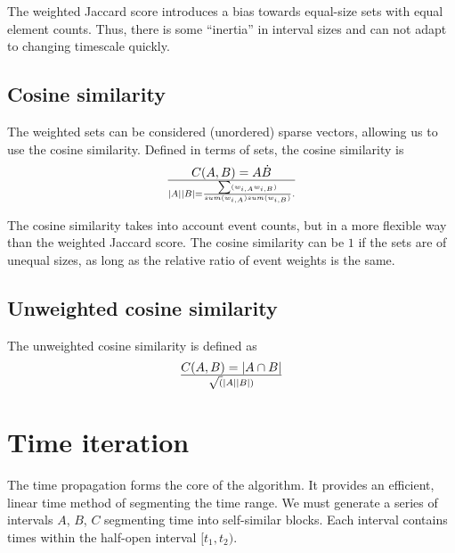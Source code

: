 \documentclass[draft]{article}
\begin{document}
The weighted Jaccard score introduces a bias towards equal-size sets
with equal element counts.  Thus, there is some ``inertia'' in
interval sizes and can not adapt to changing timescale quickly.

\subsection{Cosine similarity}
The weighted sets can be considered (unordered) sparse vectors,
allowing us to use the cosine similarity.  Defined in terms of sets, the
cosine similarity is
\begin{equation}
  C(A,B)
    = {A \dot B} \over { |A| |B| }
    = {{ \sum(w_{i,A}  w_{i,B}) }    \over   { sum(w_{i,A}) sum(w_{i,B}) }}.
\end{equation}

The cosine similarity takes into account event counts, but in a more
flexible way than the weighted Jaccard score.  The cosine similarity can
be $1$ if the sets are of unequal sizes, as long as the relative
ratio of event weights is the same.


\subsection{Unweighted cosine similarity}
The unweighted cosine similarity is defined as
\begin{equation}
  C(A,B) = {|A \cap B|} \over {\sqrt( |A| |B| )}
\end{equation}





\section{Time iteration}
\label{sec:meth-time}
The time propagation forms the core of the algorithm.  It provides an
efficient, linear time method of segmenting the time range.  We must
generate a series of intervals $A$, $B$, $C$ segmenting time into
self-similar blocks.  Each interval contains times within the
half-open interval $[t_1, t_2)$.
\end{document}
